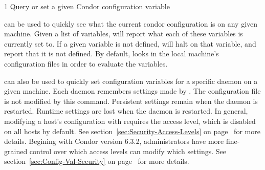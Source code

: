 \begin{ManPage}{\label{man-condor-config-val}}{1}
{Query or set a given Condor configuration variable}
\Synopsis {}








\Description

 can be used to quickly see what the current
condor configuration is on any given machine.  Given a list of
variables,  will report what each of these
variables is currently set to.  If a given variable is not defined,
 will halt on that variable, and report that it is
not defined.  By default,  looks in the local
machine's configuration files in order to evaluate the variables.

 can also be used to quickly set configuration
variables for a specific daemon on a given machine.  Each daemon
remembers settings made by .  The configuration
file is not modified by this command.  Persistent settings remain when
the daemon is restarted.  Runtime settings are lost when the daemon is
restarted.  In general, modifying a host's configuration with
requires the  access level, which is disabled on all
hosts by default.  See section~\ref{sec:Security-Access-Levels} on
page~\pageref{sec:Security-Access-Levels} for more details.
Begining with Condor version 6.3.2, administrators have more
fine-grained control over which access levels can modify which
settings.
See section~\ref{sec:Config-Val-Security} on
page~\pageref{sec:Config-Val-Security} for more details.


\end{ManPage}
